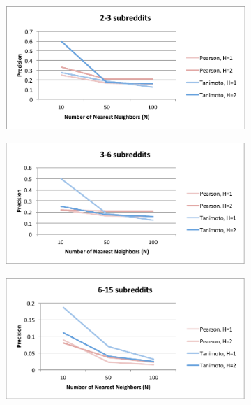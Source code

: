 \documentclass{article}
\begin{document}
\begin{figure}[h]
\centering
\begin{subfigure}{.25\textwidth}
  \centering
  \includegraphics[width=0.9\linewidth]{img/2-3-p.pdf}
  \label{fig:2-3-p}
\end{subfigure}%
\begin{subfigure}{.25\textwidth}
  \centering
  \includegraphics[width=.9\linewidth]{img/3-6-p.pdf}
  \label{fig:3-6-p}
\end{subfigure}
\begin{subfigure}{.25\textwidth}
  \centering
  \includegraphics[width=.9\linewidth]{img/6-15-p.pdf}
  \label{fig:6-15-p}
\end{subfigure}%
\begin{subfigure}{.25\textwidth}
  \centering

\end{subfigure}
\end{figure}
\end{document}
